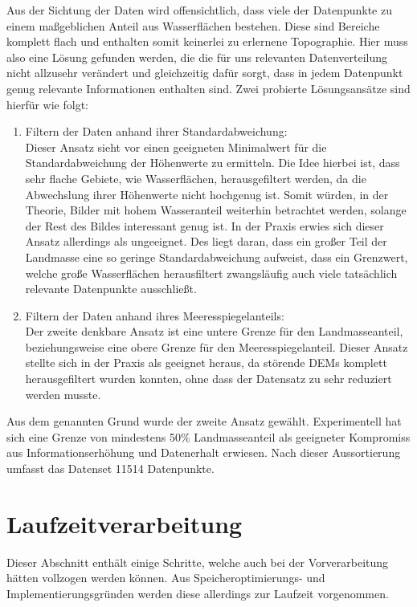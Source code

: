 Aus der Sichtung der Daten wird offensichtlich, dass viele der Datenpunkte zu einem maßgeblichen Anteil aus Wasserflächen bestehen. Diese sind Bereiche komplett flach und enthalten somit keinerlei zu erlernene Topographie. Hier muss also eine Lösung gefunden werden, die die für uns relevanten Datenverteilung nicht allzusehr verändert und gleichzeitig dafür sorgt, dass in jedem Datenpunkt genug relevante Informationen enthalten sind. Zwei probierte Lösungsansätze sind hierfür wie folgt:
\begin{enumerate}
    \item Filtern der Daten anhand ihrer Standardabweichung: \\
    Dieser Ansatz sieht vor einen geeigneten Minimalwert für die Standardabweichung der Höhenwerte zu ermitteln. Die Idee hierbei ist, dass sehr flache Gebiete, wie Wasserflächen, herausgefiltert werden, da die Abwechslung ihrer Höhenwerte nicht hochgenug ist. Somit würden, in der Theorie, Bilder mit hohem Wasseranteil weiterhin betrachtet werden, solange der Rest des Bildes interessant genug ist. In der Praxis erwies sich  dieser Ansatz allerdings als ungeeignet. Des liegt daran, dass ein großer Teil der Landmasse eine so geringe Standardabweichung aufweist, dass ein Grenzwert, welche große Wasserflächen herausfiltert zwangsläufig auch viele tatsächlich relevante Datenpunkte ausschließt.
    \item Filtern der Daten anhand ihres Meeresspiegelanteils: \\
    Der zweite denkbare Ansatz ist eine untere Grenze für den Landmasseanteil, beziehungsweise eine obere Grenze für den Meeresspiegelanteil. Dieser Ansatz stellte sich in der Praxis als geeignet heraus, da störende DEMs komplett herausgefiltert wurden konnten, ohne dass der Datensatz zu sehr reduziert werden musste.
\end{enumerate}
Aus dem genannten Grund wurde der zweite Ansatz gewählt. Experimentell hat sich eine Grenze von mindestens 50\% Landmasseanteil als geeigneter Kompromiss aus Informationserhöhung und Datenerhalt erwiesen. Nach dieser Aussortierung umfasst das Datenset 11514 Datenpunkte.

\section{Laufzeitverarbeitung}

Dieser Abschnitt enthält einige Schritte, welche auch bei der Vorverarbeitung hätten vollzogen werden können. Aus Speicheroptimierungs- und Implementierungsgründen werden diese allerdings zur Laufzeit vorgenommen.


